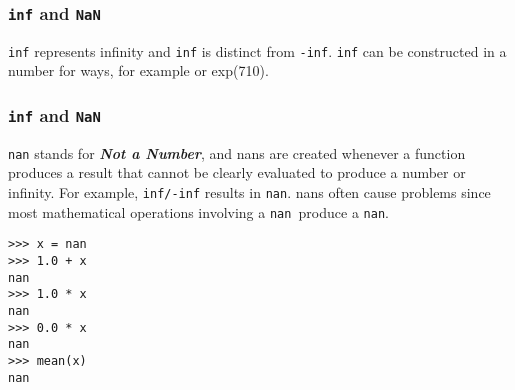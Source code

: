 \documentclass[KSmainSlides.tex]{subfiles}
\begin{document}
 

\begin{frame}[fragile]
\frametitle{ \texttt{inf} and \texttt{NaN}}
\texttt{inf} represents infinity and \texttt{inf} is distinct from \texttt{-inf}.
\texttt{inf} can be constructed in a number for ways, for
example or exp(710). 
\end{frame}
\begin{frame}[fragile]
	\frametitle{ \texttt{inf} and \texttt{NaN}}
\texttt{nan} stands for \textbf{\textit{Not a Number}}, and nans are created whenever a function produces
a result that cannot be clearly evaluated to produce a number or infinity. For example, \texttt{inf/-inf} results in
\texttt{nan}. nans often cause problems since most mathematical operations involving a \texttt{nan }produce a \texttt{nan}.
\end{frame}
\begin{frame}[fragile]
\begin{framed}
\begin{verbatim}
>>> x = nan
>>> 1.0 + x
nan
>>> 1.0 * x
nan
>>> 0.0 * x
nan
>>> mean(x)
nan
\end{verbatim}
\end{framed}
\end{frame}
\end{document}

